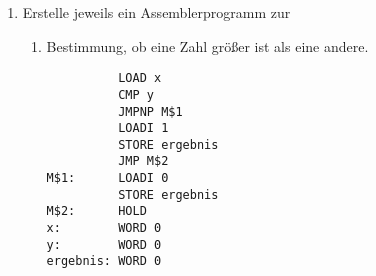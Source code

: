 \documentclass{lehramt-informatik-haupt}
\begin{document}
\begin{enumerate}
\begin{enumerate}
\begin{multicols}{2}

\begin{verbatim}
   LOAD x
   ADDI 2
   STORE x
   HOLD
x: WORD 0
\end{verbatim}

\liSpaltenUmbruch
{}

\begin{verbatim}
PROGRAM addition;
VAR x;
BEGIN
  x := x + 2;
END addition.
\end{verbatim}
\vfill\strut
\end{multicols}

%

\item {}

\begin{multicols}{2}

\begin{verbatim}
   LOAD x
   ADD y
   STORE x
   HOLD
x: WORD 0
y: WORD 0
\end{verbatim}

\liSpaltenUmbruch
{}

\begin{verbatim}
PROGRAM addition;
VAR x, y;
BEGIN
  x := x + y;
END addition.
\end{verbatim}
\vfill\strut
\end{multicols}
\end{enumerate}

%

\item Erstelle jeweils ein Assemblerprogramm zur

\begin{enumerate}

%

\item Bestimmung, ob eine Zahl größer ist als eine andere.

\begin{multicols}{2}

\begin{verbatim}
          LOAD x
          CMP y
          JMPNP M$1
          LOADI 1
          STORE ergebnis
          JMP M$2
M$1:      LOADI 0
          STORE ergebnis
M$2:      HOLD
x:        WORD 0
y:        WORD 0
ergebnis: WORD 0
\end{verbatim}


\end{multicols}
\end{enumerate}
\end{enumerate}
\end{document}
